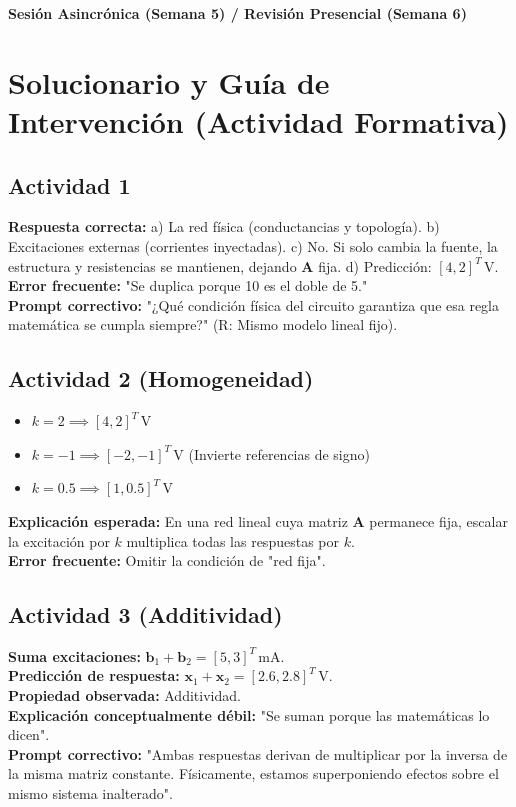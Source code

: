 \documentclass[11pt, a4paper]{article}
\begin{document}
\begin{tcolorbox}[colback=ucbblue!5!white, colframe=ucbblue, title=\textbf{Clave del Instructor: Hacia la Superposición}]
    \centering \textbf{Sesión Asincrónica (Semana 5) / Revisión Presencial (Semana 6)}
\end{tcolorbox}

\section*{Solucionario y Guía de Intervención (Actividad Formativa)}

\subsection*{Actividad 1}
\textbf{Respuesta correcta:} a) La red física (conductancias y topología). b) Excitaciones externas (corrientes inyectadas). c) No. Si solo cambia la fuente, la estructura y resistencias se mantienen, dejando $\bm{A}$ fija. d) Predicción: $[4, 2]^T\,\text{V}$. \\
\textbf{Error frecuente:} "Se duplica porque 10 es el doble de 5." \\
\textbf{Prompt correctivo:} "¿Qué condición física del circuito garantiza que esa regla matemática se cumpla siempre?" (R: Mismo modelo lineal fijo).

\subsection*{Actividad 2 (Homogeneidad)}
\begin{itemize}
    \item $k=2 \implies [4, 2]^T\,\text{V}$
    \item $k=-1 \implies [-2, -1]^T\,\text{V}$ (Invierte referencias de signo)
    \item $k=0.5 \implies [1, 0.5]^T\,\text{V}$
\end{itemize}
\textbf{Explicación esperada:} En una red lineal cuya matriz $\bm{A}$ permanece fija, escalar la excitación por $k$ multiplica todas las respuestas por $k$. \\
\textbf{Error frecuente:} Omitir la condición de "red fija". 

\subsection*{Actividad 3 (Additividad)}
\textbf{Suma excitaciones:} $\bm{b}_1 + \bm{b}_2 = [5, 3]^T\,\text{mA}$. \\
\textbf{Predicción de respuesta:} $\bm{x}_1 + \bm{x}_2 = [2.6, 2.8]^T\,\text{V}$. \\
\textbf{Propiedad observada:} Additividad. \\
\textbf{Explicación conceptualmente débil:} "Se suman porque las matemáticas lo dicen". \\
\textbf{Prompt correctivo:} "Ambas respuestas derivan de multiplicar por la inversa de la misma matriz constante. Físicamente, estamos superponiendo efectos sobre el mismo sistema inalterado".
\end{document}
